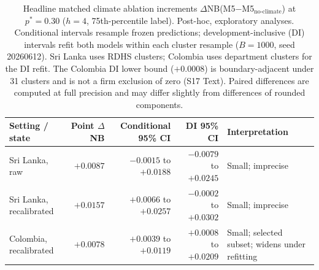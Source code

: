 \documentclass[11pt,a4paper]{article}
\begin{document}
\begin{table}[htbp]
\centering
\caption{Headline matched climate ablation increments $\Delta$NB(M5$-$M5$_{\text{no-climate}}$) at $p^*=0.30$ ($h=4$, 75th-percentile label). Post-hoc, exploratory analyses. Conditional intervals resample frozen predictions; development-inclusive (DI) intervals refit both models within each cluster resample ($B=1000$, seed 20260612). Sri Lanka uses RDHS clusters; Colombia uses department clusters for the DI refit. The Colombia DI lower bound ($+0.0008$) is boundary-adjacent under 31 clusters and is not a firm exclusion of zero (S17 Text). Paired differences are computed at full precision and may differ slightly from differences of rounded components.}
\label{tab:headline}
\footnotesize{}
\begin{tabularx}{\textwidth}{@{}p{3.5cm}rrrY@{}}
\toprule
Setting / state & Point $\Delta$NB & Conditional 95\% CI & DI 95\% CI & Interpretation \\
\midrule
Sri Lanka, raw & $+0.0087$ & $-0.0015$ to $+0.0188$ & $-0.0079$ to $+0.0245$ & Small; imprecise \\
Sri Lanka, recalibrated & $+0.0157$ & $+0.0066$ to $+0.0257$ & $-0.0002$ to $+0.0302$ & Small; imprecise \\
Colombia, recalibrated & $+0.0078$ & $+0.0039$ to $+0.0119$ & $+0.0008$ to $+0.0209$ & Small; selected subset; widens under refitting \\
\bottomrule
\end{tabularx}
\end{table}
\end{document}

